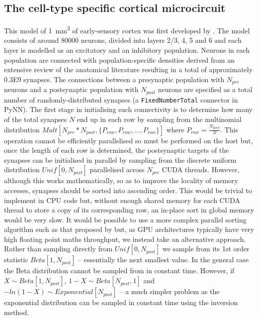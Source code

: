 \documentclass[utf8]{frontiersSCNS} %
\begin{document}
\subsection{The cell-type specific cortical microcircuit}
\label{sec:method/microcircuit}
This model of \SI{1}{\milli\metre\cubed} of early-sensory cortex was first developed by \citet{Potjans2012}.
The model consists of around \num{80000} neurons, divided into layers 2/3, 4, 5 and 6 and each layer is modelled as an excitatory and an inhibitory population.
Neurons in each population are connected with population-specific densities derived from an extensive review of the anatomical literature resulting in a total of approximately \num{0.3E9} synapses.
The connections between a presynaptic population with $N_{pre}$ neurons and a postsynaptic population with $N_{post}$ neurons are specified as a total number of randomly-distributed synapses (a \lstinline{FixedNumberTotal} connector in PyNN).
The first stage in initialising such connectivity is to determine how many of the total synapses $N$ end up in each row by sampling from the multinomial distribution $Mult[N_{pre} * N_{post}, \{P_{row}, P_{row}, \ldots, P_{row}\}]$ where $P_{row} = \frac{N_{post}}{N}$.
This operation cannot be efficiently parallelised so must be performed on the host but, once the length of each row is determined, the postsynaptic targets of the synapses can be initialised in parallel by sampling from the discrete uniform distribution $Unif[0, N_{post}]$ parallelised across $N_{pre}$ CUDA threads.
However, although this works mathematically, so as to improve the locality of memory accesses, synapses should be sorted into ascending order.
This would be trivial to implement in CPU code but, without enough shared memory for each CUDA thread to store a copy of its corresponding row, an in-place sort in global memory would be very slow.
It would be possible to use a more complex parallel sorting algorithm such as that proposed by \citet{Awan2016} but, as GPU architectures typically have very high floating point maths throughput, we instead take an alternative approach.
Rather than sampling directly from $Unif[0, N_{post}]$ we sample from its 1st order statistic $Beta[1, N_{post}]$ -- essentially the next smallest value.
In the general case the Beta distribution cannot be sampled from in constant time.
However, if $X \sim Beta[1, N_{post}]$, $1 - X \sim Beta[N_{post}, 1]$ and $-ln(1 - X) \sim Exponential[N_{post}]$ -- a much simpler problem as the exponential distribution can be sampled in constant time using the inversion method.
\end{document}
